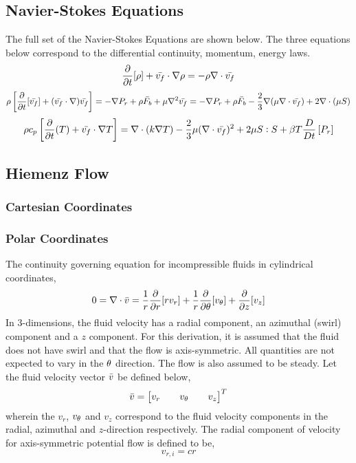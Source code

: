\documentclass[class=report, 12pt, crop=false]{standalone}
\begin{document}
\begin{center}
\chapter{Navier-Stokes Equations}
\begin{comment}
\end{comment}
The full set of the Navier-Stokes Equations are shown below. The three equations below correspond to the differential continuity, momentum, energy laws.
$$\frac{\partial}{\partial t}[\rho] + \bar{v_f} \cdot \nabla\rho = -\rho \nabla \cdot \bar{v_f}$$
$$\rho \left[\frac{\partial}{\partial t}[\bar{v_f}] + (\bar{v_f} \cdot \nabla) \bar{v_f}\right] = -\nabla P_r + \rho \bar{F_b} + \mu\nabla^2\bar{v_f} = -\nabla P_r + \rho \bar{F_b} - \frac{2}{3}\nabla(\mu\nabla\cdot \bar{v_f}) + 2\nabla\cdot(\mu S)$$
$$\rho c_p\left[\frac{\partial}{\partial t}(T) + \bar{v_f}\cdot\nabla T \right] = \nabla\cdot(k\nabla T) - \frac{2}{3}\mu(\nabla\cdot \bar{v_f})^2 + 2\mu S:S + \beta T \frac{D}{Dt}\left[P_r\right]$$
\section{Hiemenz Flow}
\begin{comment}
\end{comment}
\subsection{Cartesian Coordinates}
\begin{comment}
\end{comment}
\subsection{Polar Coordinates}
\begin{comment}
\end{comment}
The continuity governing equation for incompressible fluids in cylindrical coordinates,
$$0=\nabla\cdot \bar{v} = \frac{1}{r}\frac{\partial}{\partial r}[r v_r] + \frac{1}{r} \frac{\partial}{\partial \theta}[v_\theta] + \frac{\partial}{\partial z}[v_z]$$
In $3$-dimensions, the fluid velocity has a radial component, an azimuthal (swirl) component and a $z$ component. For this derivation, it is assumed that the fluid does not have swirl and that the flow is axis-symmetric. All quantities are not expected to vary in the $\theta$ direction. The flow is also assumed to be steady. Let the fluid velocity vector $\bar{v}$ be defined below,
$$\bar{v} = \begin{bmatrix} v_r && v_\theta && v_z \end{bmatrix}^T$$
wherein the $v_r$, $v_\theta$ and $v_z$ correspond to the fluid velocity components in the radial, azimuthal and $z$-direction respectively. The radial component of velocity for axis-symmetric potential flow is defined to be,
$$v_{r,i} = cr$$


\end{center}
\end{document}
